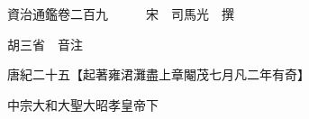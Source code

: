 










 


 
 


 

  
  
  
  
  





  
  
  
  
  
 
  

  

  
  
  



  

 
 

  
   




  

  
  


  　　資治通鑑卷二百九　　　宋　司馬光　撰

　　胡三省　音注

　　唐紀二十五【起著雍涒灘盡上章閹茂七月凡二年有奇】

　　中宗大和大聖大昭孝皇帝下

